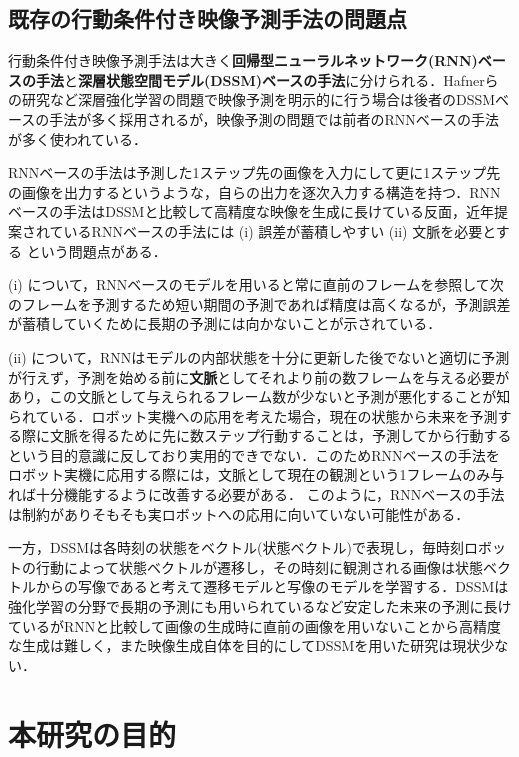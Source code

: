 \subsection{既存の行動条件付き映像予測手法の問題点}

行動条件付き映像予測手法は大きく{\bf 回帰型ニューラルネットワーク(RNN)ベースの手法}と{\bf 深層状態空間モデル(DSSM)ベースの手法}に分けられる．Hafnerら\cite{hafner2019planet}の研究など深層強化学習の問題で映像予測を明示的に行う場合は後者のDSSMベースの手法が多く採用されるが，映像予測の問題では前者のRNNベースの手法が多く使われている\cite{denton2018stochastic}\cite{villegas2019high}．

RNNベースの手法は予測した1ステップ先の画像を入力にして更に1ステップ先の画像を出力するというような，自らの出力を逐次入力する構造を持つ．RNNベースの手法はDSSMと比較して高精度な映像を生成に長けている反面，近年提案されているRNNベースの手法には (i) 誤差が蓄積しやすい (ii) 文脈を必要とする という問題点がある．

(i) について，RNNベースのモデルを用いると常に直前のフレームを参照して次のフレームを予測するため短い期間の予測であれば精度は高くなるが，予測誤差が蓄積していくために長期の予測には向かないことが示されている\cite{hafner2019planet}．

(ii) について，RNNはモデルの内部状態を十分に更新した後でないと適切に予測が行えず，予測を始める前に{\bf 文脈}としてそれより前の数フレームを与える必要があり，この文脈として与えられるフレーム数が少ないと予測が悪化することが知られている\cite{villegas2019high}．ロボット実機への応用を考えた場合，現在の状態から未来を予測する際に文脈を得るために先に数ステップ行動することは，予測してから行動するという目的意識に反しており実用的できでない．このためRNNベースの手法をロボット実機に応用する際には，文脈として現在の観測という1フレームのみ与れば十分機能するように改善する必要がある．
このように，RNNベースの手法は制約がありそもそも実ロボットへの応用に向いていない可能性がある．

一方，DSSMは各時刻の状態をベクトル(状態ベクトル)で表現し，毎時刻ロボットの行動によって状態ベクトルが遷移し，その時刻に観測される画像は状態ベクトルからの写像であると考えて遷移モデルと写像のモデルを学習する．DSSMは強化学習の分野で長期の予測にも用いられているなど安定した未来の予測に長けているがRNNと比較して画像の生成時に直前の画像を用いないことから高精度な生成は難しく，また映像生成自体を目的にしてDSSMを用いた研究は現状少ない．

\section{本研究の目的}

